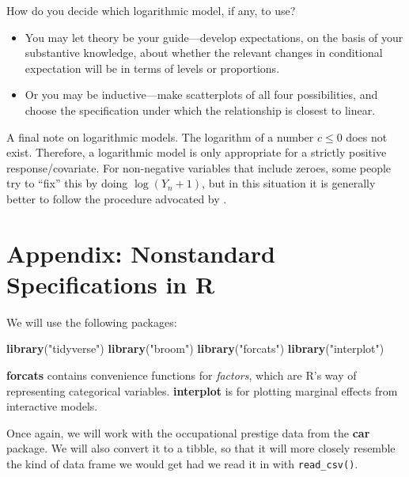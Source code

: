 \documentclass[12pt,oneside,openany]{book}
\newenvironment{Shaded}{\begin{snugshade}}{\end{snugshade}}
\newcommand{\KeywordTok}[1]{\textcolor[rgb]{0.13,0.29,0.53}{\textbf{#1}}}
\newcommand{\StringTok}[1]{\textcolor[rgb]{0.31,0.60,0.02}{#1}}
\newcommand{\NormalTok}[1]{#1}
\begin{document}
How do you decide which logarithmic model, if any, to use?

\begin{itemize}
\item
  You may let theory be your guide---develop expectations, on the basis
  of your substantive knowledge, about whether the relevant changes in
  conditional expectation will be in terms of levels or proportions.
\item
  Or you may be inductive---make scatterplots of all four possibilities,
  and choose the specification under which the relationship is closest
  to linear.
\end{itemize}

A final note on logarithmic models. The logarithm of a number
\(c \leq 0\) does not exist. Therefore, a logarithmic model is only
appropriate for a strictly positive response/covariate. For non-negative
variables that include zeroes, some people try to ``fix'' this by doing
\(\log(Y_n + 1)\), but in this situation it is generally better to
follow the procedure advocated by \citet{burbidge1988alternative}.

\section{Appendix: Nonstandard Specifications in
R}\label{appendix-nonstandard-specifications-in-r}

We will use the following packages:

\begin{Shaded}
\begin{Highlighting}[]
\KeywordTok{library}\NormalTok{(}\StringTok{"tidyverse"}\NormalTok{)}
\KeywordTok{library}\NormalTok{(}\StringTok{"broom"}\NormalTok{)}
\KeywordTok{library}\NormalTok{(}\StringTok{"forcats"}\NormalTok{)}
\KeywordTok{library}\NormalTok{(}\StringTok{"interplot"}\NormalTok{)}
\end{Highlighting}
\end{Shaded}

\textbf{forcats} contains convenience functions for \emph{factors},
which are R's way of representing categorical variables.
\textbf{interplot} is for plotting marginal effects from interactive
models.

Once again, we will work with the occupational prestige data from the
\textbf{car} package. We will also convert it to a tibble, so that it
will more closely resemble the kind of data frame we would get had we
read it in with \texttt{read\_csv()}.
\end{document}
